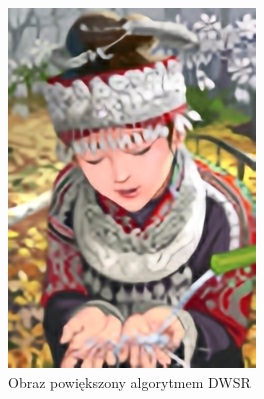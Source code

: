 \begin{figure}[ht]
\begin{minipage}[t]{0.3\linewidth}
        \includegraphics[width=\linewidth]{Rozdziały/02.Podstawy_teoretyczne/comic_DWSR_x4.png}
        \caption{Obraz powiększony algorytmem DWSR}
        \label{fig:image12}
    \end{minipage}
    \hspace{0.5cm}
    \begin{minipage}[t]{0.3\linewidth}

\end{minipage}
\end{figure}
